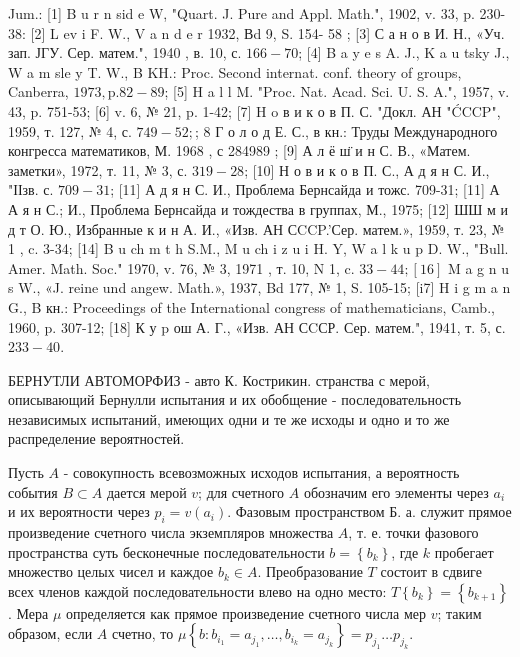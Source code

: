 \documentclass[10pt]{article}
\begin{document}
Jum.: [1] B u r n sid e W, "Quart. J. Pure and Appl. Math.", 1902, v. 33, p. 230-38: [2] L ev i F. W., V a n d e r 1932, Вd 9, S. 154- 58 ; [3] С а н о в И. Н., «Уч. зап. ЈГУ. Сер. матем.", 1940 , в. 10, с. $166-70$; [4] B a y e s A. J., K a u tsky J., W a m sle y T. W., B KH.: Proc. Second internat. conf. theory of groups, Canberra, $1973, \mathrm{p} .82-89$; [5] H a l l M. "Proc. Nat. Acad. Sci. U. S. A.", 1957, v. 43, p. 751-53; [6] v. 6, № 21, p. 1-42; [7] H o в и к о в П. С. "Докл. АН "ĆCCP", 1959, т. 127, № 4, с. $749-52 ;$; 8 Г о л о д Е. С., в кн.: Труды Международного конгресса математиков, М. 1968 , с 284989 ; [9] А л ё ш̈ и н С. В., «Матем. заметки», 1972, т. 11, № 3, с. $319-28$; [10] Н о в и к о в П. С., А д я н С. И., "ІІзв. с. $709-31$; [11] А д я н С. И., Проблема Бернсайда и тожс. 709-31; [11] А А я н С.; И., Проблема Бернсайда и тождества в группах, М., 1975; [12] ШШ м и д т О. Ю., Избранные к и н А. И., «Изв. АН СCCP.'Сер. матем.», 1959, т. 23, № 1 , c. 3-34; [14] B u ch m t h S.M., M u ch i z u i H. Y, W a l k u p D. W., "Bull. Amer. Math. Soc." 1970, v. 76, № 3, 1971 , т. 10, N 1, c. $33-44 ;[16]$ M a g n u s W., «J. reine und angew. Math.», 1937, Bd 177, № 1, S. 105-15; [i7] H i g m a n G., B кн.: Proceedings of the International congress of mathematicians, Camb., 1960, p. 307-12; [18] К у p ош А. Г., «Изв. АН СCСР. Сер. матем.", 1941, т. 5, с. $233-40$.



БЕРНУТЛИ АВТОМОРФИЗ - авто К. Кострикин. странства с мерой, описывающий Бернулли испытания и их обобщение - последовательность независимых испытаний, имеющих одни и те же исходы и одно и то же распределение вероятностей.



Пусть $A$ - совокупность всевозможных исходов испытания, а вероятность события $B \subset A$ дается мерой $v$; для счетного $A$ обозначим его элементы через $a_{i}$ и их вероятности через $p_{i}=v\left(a_{i}\right)$. Фазовым пространством Б. а. служит прямое произведение счетного числа экземпляров множества $A$, т. е. точки фазового пространства суть бесконечные последовательности $b=\left\{b_{k}\right\}$, где $k$ пробегает множество целых чисел и каждое $b_{k} \in A$. Преобразование $T$ состоит в сдвиге всех членов каждой последовательности влево на одно место: $T\left\{b_{k}\right\}=\left\{b_{k+1}\right\}$. Мера $\mu$ определяется как прямое произведение счетного числа мер $v$; таким образом, если $A$ счетно, то $\mu\left\{b: b_{i_{1}}=a_{j_{1}}, \ldots, b_{i_{k}}=a_{j_{k}}\right\}=p_{j_{1}} \ldots p_{j_{k}}$.
\end{document}

